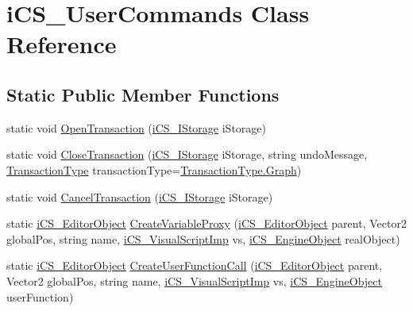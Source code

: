 \hypertarget{classi_c_s___user_commands}{\section{i\+C\+S\+\_\+\+User\+Commands Class Reference}
\label{classi_c_s___user_commands}
}
\subsection*{Static Public Member Functions}
\begin{DoxyCompactItemize}
\item 
static void \hyperlink{classi_c_s___user_commands_a321b83dd923cb5bd2a59da15a67f48f1}{Open\+Transaction} (\hyperlink{classi_c_s___i_storage}{i\+C\+S\+\_\+\+I\+Storage} i\+Storage)
\item 
static void \hyperlink{classi_c_s___user_commands_aee2c487be74ae839d4781fa1a707ebc9}{Close\+Transaction} (\hyperlink{classi_c_s___i_storage}{i\+C\+S\+\_\+\+I\+Storage} i\+Storage, string undo\+Message, \hyperlink{i_c_s___i_storage___storage_mgmt_8cs_aa7a2e64697569804f14626bbb2649a58}{Transaction\+Type} transaction\+Type=\hyperlink{i_c_s___i_storage___storage_mgmt_8cs_aa7a2e64697569804f14626bbb2649a58a4cdbd2bafa8193091ba09509cedf94fd}{Transaction\+Type.\+Graph})
\item 
static void \hyperlink{classi_c_s___user_commands_a50090da9e74e038606c01bc92e26dff3}{Cancel\+Transaction} (\hyperlink{classi_c_s___i_storage}{i\+C\+S\+\_\+\+I\+Storage} i\+Storage)
\item 
static \hyperlink{classi_c_s___editor_object}{i\+C\+S\+\_\+\+Editor\+Object} \hyperlink{classi_c_s___user_commands_acc4a97c4ab745dbeced264908e8cd643}{Create\+Variable\+Proxy} (\hyperlink{classi_c_s___editor_object}{i\+C\+S\+\_\+\+Editor\+Object} parent, Vector2 global\+Pos, string name, \hyperlink{classi_c_s___visual_script_imp}{i\+C\+S\+\_\+\+Visual\+Script\+Imp} vs, \hyperlink{classi_c_s___engine_object}{i\+C\+S\+\_\+\+Engine\+Object} real\+Object)
\item 
static \hyperlink{classi_c_s___editor_object}{i\+C\+S\+\_\+\+Editor\+Object} \hyperlink{classi_c_s___user_commands_a702b8c43de381d95e31b8c85fae54479}{Create\+User\+Function\+Call} (\hyperlink{classi_c_s___editor_object}{i\+C\+S\+\_\+\+Editor\+Object} parent, Vector2 global\+Pos, string name, \hyperlink{classi_c_s___visual_script_imp}{i\+C\+S\+\_\+\+Visual\+Script\+Imp} vs, \hyperlink{classi_c_s___engine_object}{i\+C\+S\+\_\+\+Engine\+Object} user\+Function)

\end{DoxyCompactItemize}

